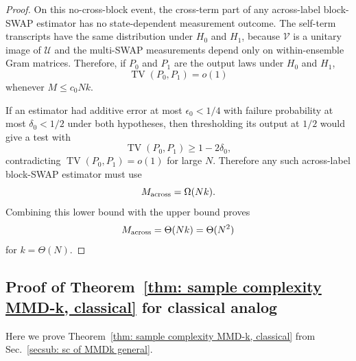 \documentclass[aps,prx,reprint,superscriptaddress,amsmath,amssymb,longbibliography,floatfix]{revtex4-2}
\newcommand{\scU}{\mathcal{U}}
\newcommand{\scV}{\mathcal{V}}
\DeclareMathOperator{\TV}{TV}
\theoremstyle{plain}
\theoremstyle{definition}
\theoremstyle{remark}
\begin{document}
\begin{proof}
On this no-cross-block event, the cross-term part of any across-label block-SWAP estimator
has no state-dependent measurement outcome. The self-term transcripts have the same distribution
under \(H_0\) and \(H_1\), because \(\scV\) is a unitary image of \(\scU\) and the multi-SWAP
measurements depend only on within-ensemble Gram matrices. Therefore, if \(P_0\) and \(P_1\)
are the output laws under \(H_0\) and \(H_1\),
\[
    \TV(P_0,P_1)=o(1)
\]
whenever \(M\le c_0Nk\).

If an estimator had additive error at most \(\epsilon_0<1/4\) with failure probability at most
\(\delta_0<1/2\) under both hypotheses, then thresholding its output at \(1/2\) would give a
test with
\[
    \TV(P_0,P_1)\ge 1-2\delta_0,
\]
contradicting \(\TV(P_0,P_1)=o(1)\) for large \(N\). Therefore any such across-label
block-SWAP estimator must use
\[
    M_{\rm across}=\Omega(Nk).
\]
Combining this lower bound with the upper bound proves
\begin{equation}
    M_{\rm across}=\Theta(Nk)=\Theta(N^2)
\label{eq:app-large-k-complexity}
\end{equation}
for \(k=\Theta(N)\).
\end{proof}

\subsection{Proof of Theorem~\ref{thm: sample complexity MMD-k, classical} for classical analog}
\label{app:Proof of classical analog}
Here we prove Theorem~\ref{thm: sample complexity MMD-k, classical} from Sec.~\ref{secsub: sc of MMDk general}.
\end{document}

